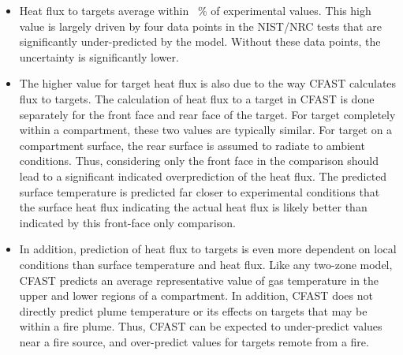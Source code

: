 \begin{itemize}
\item Heat flux to targets average within \Targfluxavg ~\% of experimental values. This high value is largely driven by four data points in the NIST/NRC tests that are significantly under-predicted by the model.  Without these data points, the uncertainty is significantly lower.
\item The higher value for target heat flux is also due to the way CFAST calculates flux to targets.  The calculation of heat flux to a target in CFAST is done separately for the front face and rear face of the target.  For target completely within a compartment, these two values are typically similar.  For target on a compartment surface, the rear surface is assumed to radiate to ambient conditions.  Thus, considering only the front face in the comparison should lead to a significant indicated overprediction of the heat flux. The predicted surface temperature is predicted far closer to experimental conditions that the surface heat flux indicating the actual heat flux is likely better than indicated by this front-face only comparison. 
\item  In addition, prediction of heat flux to targets is even more dependent on local conditions than surface temperature and heat flux.  Like any two-zone model, CFAST predicts an average representative value of gas temperature in the upper and lower regions of a compartment.  In addition, CFAST does not directly predict plume temperature or its effects on targets that may be within a fire plume.  Thus, CFAST can be expected to under-predict values near a fire source, and over-predict values for targets remote from a fire.
\end{itemize}
